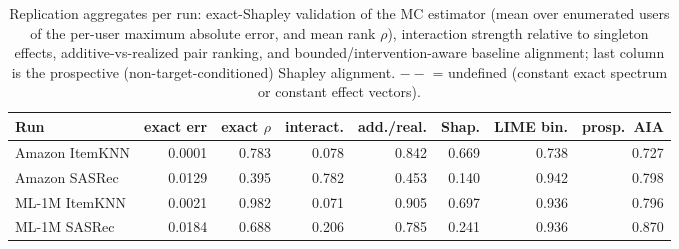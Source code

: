 \begin{table}[t]\centering\scriptsize\setlength{\tabcolsep}{2.5pt}
\caption{Replication aggregates per run: exact-Shapley validation of the
MC estimator (mean over enumerated users of the per-user maximum absolute
error, and mean rank $\rho$),
interaction strength relative to singleton effects, additive-vs-realized pair
ranking, and bounded/intervention-aware baseline alignment; last column is the
prospective (non-target-conditioned) Shapley alignment. $--$ = undefined
(constant exact spectrum or constant effect vectors).}
\label{tab:review3}
\begin{tabular}{@{}lrrrrrrr@{}}
\toprule
Run & exact err & exact $\rho$ & interact. & add./real. & Shap. & LIME bin. & prosp.\ AIA \\
\midrule
Amazon ItemKNN & 0.0001 & 0.783 & 0.078 & 0.842 & 0.669 & 0.738 & 0.727 \\
Amazon SASRec & 0.0129 & 0.395 & 0.782 & 0.453 & 0.140 & 0.942 & 0.798 \\
ML-1M ItemKNN & 0.0021 & 0.982 & 0.071 & 0.905 & 0.697 & 0.936 & 0.796 \\
ML-1M SASRec & 0.0184 & 0.688 & 0.206 & 0.785 & 0.241 & 0.936 & 0.870 \\
\bottomrule
\end{tabular}
\end{table}
